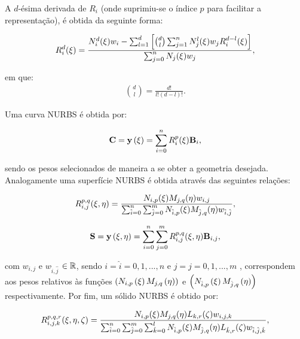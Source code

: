 \documentclass[tese_patricia]{subfiles}
\begin{document}
A $d$-ésima derivada de $R_{i}$ (onde suprimiu-se o índice $p$ para facilitar a representação), é obtida da seguinte forma:

\begin{align}
R_{i}^{d}(\xi) = \frac{N_{i}^{d}(\xi)w_i - \sum_{l=1}^{d}\left[\binom{d}{l}\sum_{j=1}^{n}N_{j}^{l}(\xi)w_{j}R_{i}^{d-l}(\xi)\right]}{\sum_{{j}=0}^{n}N_{{j}}(\xi)w_{{j}}},
\end{align}

\noindent em que:
\begin{align}
\binom{d}{l} = \frac{d!}{l!\left(d-l\right)!}.
\end{align}

Uma curva NURBS é obtida por:

\begin{align}
\mathbf{C} = \mathbf{y}\left(\xi\right) = \sum_{i=0}^{n}R_{i}^{p}(\xi)\mathbf{B}_i, \label{eq:curveNURBS}
\end{align}

\noindent sendo os pesos selecionados de maneira a se obter a geometria desejada. Analogamente uma superfície NURBS é obtida através das seguintes relações:

\begin{align}
R_{i,j}^{p,q}(\xi,\eta) = \frac{N_{i,p}(\xi)M_{j,q}(\eta)w_{i,j}}{\sum_{\hat{i}=0}^{n}\sum_{\hat{j}=0}^{m}N_{\hat{i},p}(\xi)M_{\hat{j},q}(\eta)w_{\hat{i},\hat{j}}},
\end{align}

\begin{align}
\mathbf{S} = \mathbf{y}\left(\xi,\eta\right) = \sum_{i=0}^{n}\sum_{j=0}^{m}R_{i,j}^{p,q}(\xi,\eta)\mathbf{B}_{i,j}, \label{eq:surfaceNURBS}
\end{align}

\noindent com $w_{i,j}$ e $w_{\hat{i},\hat{j}}$ $\in \mathbb{R}$, sendo $i = \hat{i} =  0, 1, ... , n$ e  $j = \hat{j} =  0, 1, ... , m$ , correspondem aos pesos relativos às funções $\left(N_{i,p}\left(\xi\right)M_{j,q}\left(\eta\right)\right)$ e $\left(N_{\hat{i},p}\left(\xi\right)M_{\hat{j},q}\left(\eta\right)\right)$ respectivamente. Por fim, um sólido NURBS é obtido por:

\begin{align}
R_{i,j,k}^{p,q,r}(\xi,\eta,\zeta) = \frac{N_{i,p}(\xi)M_{j,q}(\eta)L_{k,r}(\zeta)w_{i,j,k}}
{\sum_{\hat{i}=0}^{n}\sum_{\hat{j}=0}^{m}\sum_{\hat{k}=0}^{l}N_{\hat{i},p}(\xi)M_{\hat{j},q}(\eta)L_{\hat{k},r}(\zeta)w_{\hat{i},\hat{j},\hat{k}}},
\end{align}
\end{document}
